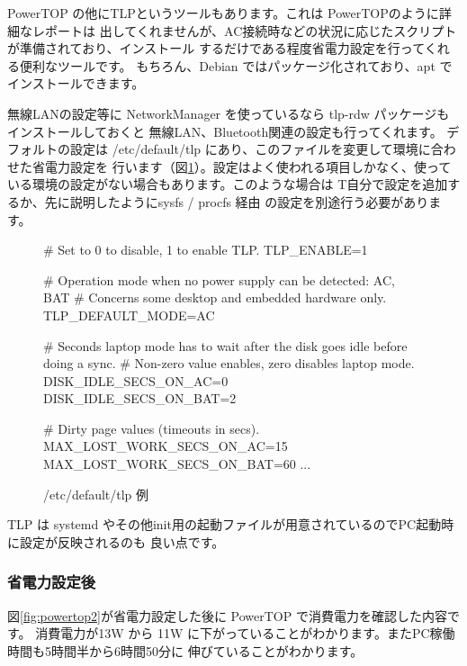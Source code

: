 \documentclass[mingoth,a4paper]{jsarticle}
\begin{document}
PowerTOP の他にTLPというツールもあります。これは PowerTOPのように詳細なレポートは
出してくれませんが、AC接続時などの状況に応じたスクリプトが準備されており、インストール
するだけである程度省電力設定を行ってくれる便利なツールです。
もちろん、Debian ではパッケージ化されており、apt でインストールできます。


無線LANの設定等に NetworkManager を使っているなら tlp-rdw パッケージもインストールしておくと
無線LAN、Bluetooth関連の設定も行ってくれます。
デフォルトの設定は /etc/default/tlp にあり、このファイルを変更して環境に合わせた省電力設定を
行います（図\ref{fig:TLP}）。設定はよく使われる項目しかなく、使っている環境の設定がない場合もあります。このような場合は
T自分で設定を追加するか、先に説明したようにsysfs / procfs 経由
の設定を別途行う必要があります。


\begin{figure}[H]
\begin{center}
\begin{commandline}
# Set to 0 to disable, 1 to enable TLP.
TLP_ENABLE=1

# Operation mode when no power supply can be detected: AC, BAT
# Concerns some desktop and embedded hardware only.
TLP_DEFAULT_MODE=AC

# Seconds laptop mode has to wait after the disk goes idle before doing a sync.
# Non-zero value enables, zero disables laptop mode.
DISK_IDLE_SECS_ON_AC=0
DISK_IDLE_SECS_ON_BAT=2

# Dirty page values (timeouts in secs).
MAX_LOST_WORK_SECS_ON_AC=15
MAX_LOST_WORK_SECS_ON_BAT=60
...
\end{commandline}
\end{center}
\label{fig:TLP}
\caption{/etc/default/tlp 例} 
\end{figure}

TLP は systemd やその他init用の起動ファイルが用意されているのでPC起動時に設定が反映されるのも
良い点です。

\subsubsection{省電力設定後}
図\ref{fig:powertop2}が省電力設定した後に PowerTOP で消費電力を確認した内容です。
消費電力が13W から 11W に下がっていることがわかります。またPC稼働時間も5時間半から6時間50分に
伸びていることがわかります。
\end{document}
